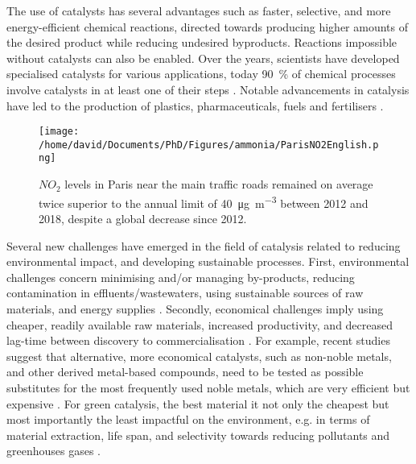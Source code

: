 The use of catalysts has several advantages such as faster, selective, and more energy-efficient chemical reactions, directed towards producing higher amounts of the desired product while reducing undesired byproducts.
Reactions impossible without catalysts can also be enabled.
Over the years, scientists have developed specialised catalysts for various applications, today \qty{90}{\percent} of chemical processes involve catalysts in at least one of their steps \parencite{Weiner1998, DeVries2012}.
Notable advancements in catalysis have led to the production of plastics, pharmaceuticals, fuels and fertilisers \parencite{Fechete2012}.

\begin{figure}[!htb]
    \centering
    \texttt{[image: /home/david/Documents/PhD/Figures/ammonia/ParisNO2English.png]}
    \caption{
        $NO_2$ levels in Paris near the main traffic roads remained on average twice superior to the annual limit of \qty{40}{\ug \per \m^3} \parencite{AirParis} between 2012 and 2018, despite a global decrease since 2012.
    }
    \label{fig:NO2Paris}
\end{figure}

Several new challenges have emerged in the field of catalysis related to reducing environmental impact, and developing sustainable processes.
First, environmental challenges concern minimising and/or managing by-products, reducing contamination in effluents/wastewaters, using sustainable sources of raw materials, and energy supplies \parencite{Ludwig2017, Lange2021}.
Secondly, economical challenges imply using cheaper, readily available raw materials, increased productivity, and decreased lag-time between discovery to commercialisation \parencite{Keisuke2019, Gunay2021}.
For example, recent studies suggest that alternative, more economical catalysts, such as non-noble metals, and other derived metal-based compounds, need to be tested as possible substitutes for the most frequently used noble metals, which are very efficient but expensive \parencite{Zhong2021, Ruan2022}.
For green catalysis, the best material it not only the cheapest but most importantly the least impactful on the environment, e.g. in terms of material extraction, life span, and selectivity towards reducing pollutants and greenhouses gases \parencite{Lange2021}.

